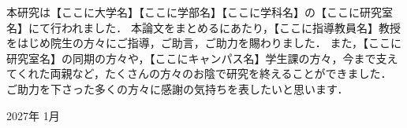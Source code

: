

本研究は【ここに大学名】【ここに学部名】【ここに学科名】の【ここに研究室名】にて行われました．
本論文をまとめるにあたり，【ここに指導教員名】教授をはじめ院生の方々にご指導，ご助言，ご助力を賜わりました．
また，【ここに研究室名】の同期の方々や，【ここにキャンパス名】学生課の方々，今まで支えてくれた両親など，たくさんの方々のお陰で研究を終えることができました．
ご助力を下さった多くの方々に感謝の気持ちを表したいと思います．

\begin{flushright}
2027年 1月 \\
\end{flushright}
\newpage
